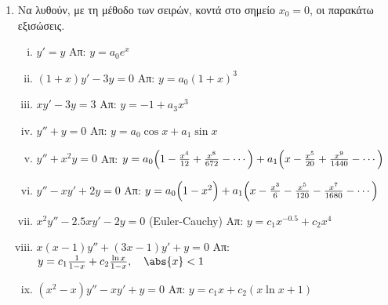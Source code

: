 


\pagestyle{askhseis}
\everymath{\displaystyle}





\begin{center}
\end{center}

\vspace{\baselineskip}

\begin{enumerate}
  \item Να λυθούν, με τη μέθοδο των σειρών, κοντά στο σημείο $ x_{0}=0 $, οι παρακάτω 
    εξισώσεις.
    \begin{enumerate}[i)]
      \item $ y'=y $
        \hfill Απ: $ y= a_{0}e^{x} $ 

      \item $ (1+x)y'-3y=0 $
        \hfill Απ: $ y= a_{0}(1+x)^{3} $ 

      \item $ x y'-3y=3 $
        \hfill Απ: $ y= - 1 + a_{3} x^{3} $ 

      \item $ y''+y=0 $
        \hfill Απ: $ y= a_{0} \cos{x} + a_{1} \sin{x} $

      \item $ y'' + x^{2}y = 0 $
        \hfill Απ: $ y= a_{0}\Bigl(1- \frac{x^{4}}{12} + \frac{x^{8}}{672} - 
          \cdots\Bigr) + a_{1} \Bigl(x - \frac{x^{5}}{20} + \frac{x^{9}}{1440} - 
        \cdots\Bigr) $ 

      \item $ y'' -xy'+2y=0 $
        \hfill Απ: $ y = a_{0}\Bigl(1-x^{2}\Bigr) + a_{1}
        \Bigl(x - \frac{x^{3}}{6} - \frac{x^{5}}{120} - \frac{x^{7}}{1680} - 
        \cdots \Bigr) $ 

      \item  $ x^{2}y'' - 2.5 x y' -2y=0 $ \quad (Euler-Cauchy)
        \hfill Απ: $ y = c_{1}x^{-0.5}+ c_{2}x^{4} $ 

      \item $ x(x-1)y''+(3x-1)y'+y=0 $ 
        \hfill Απ: $ y= c_{1} \frac{1}{1-x} + c_{2} \frac{\ln{x}}{1-x}, 
        \quad \abs{x} <1$ 

      \item $ (x^{2}-x)y'' -xy'+y=0 $
        \hfill Απ:  $ y= c_{1}x + c_{2}(x \ln{x} + 1) $


\end{enumerate}
\end{enumerate}
